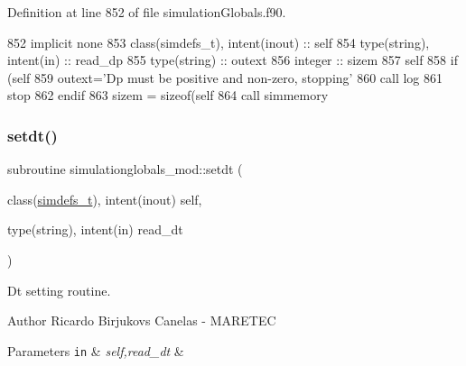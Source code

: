 Definition at line 852 of file simulation\+Globals.\+f90.


\begin{DoxyCode}
852     \textcolor{keywordtype}{implicit none}
853     \textcolor{keywordtype}{class}(simdefs\_t), \textcolor{keywordtype}{intent(inout)} :: self
854     \textcolor{keywordtype}{type}(string), \textcolor{keywordtype}{intent(in)} :: read\_dp
855     \textcolor{keywordtype}{type}(string) :: outext
856     \textcolor{keywordtype}{integer} :: sizem
857     self%
858     \textcolor{keywordflow}{if} (self%
859         outext=\textcolor{stringliteral}{'Dp must be positive and non-zero, stopping'}
860         \textcolor{keyword}{call }log%
861         stop
862 \textcolor{keywordflow}{    endif}
863     sizem = sizeof(self%
864     \textcolor{keyword}{call }simmemory%
\end{DoxyCode}
\mbox{\label{namespacesimulationglobals__mod_a0eced3f4367d08f3d0cb6ef2044bdc56}} 
\subsubsection{\texorpdfstring{setdt()}{setdt()}}
{\footnotesize\ttfamily subroutine simulationglobals\+\_\+mod\+::setdt (\begin{DoxyParamCaption}\item[{class(\mbox{\hyperlink{structsimulationglobals__mod_1_1simdefs__t}{simdefs\+\_\+t}}), intent(inout)}]{self,  }\item[{type(string), intent(in)}]{read\+\_\+dt }\end{DoxyParamCaption})\hspace{0.3cm}{\ttfamily [private]}}



Dt setting routine. 

\begin{DoxyAuthor}{Author}
Ricardo Birjukovs Canelas -\/ M\+A\+R\+E\+T\+EC 
\end{DoxyAuthor}

\begin{DoxyParams}[1]{Parameters}
\mbox{\tt in}  & {\em self,read\+\_\+dt} & \\
\hline
\end{DoxyParams}


